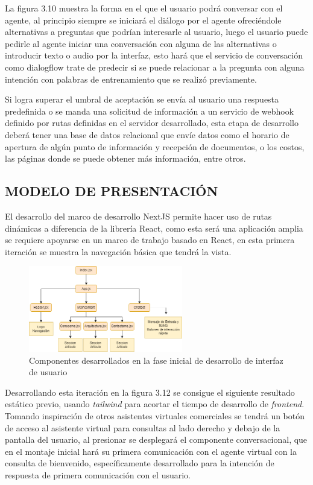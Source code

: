 \documentclass[letter, openright, 12pt]{book}
\begin{document}
La figura 3.10 muestra la forma en el que el usuario podrá conversar con el agente, al principio siempre se iniciará el diálogo por el agente ofreciéndole alternativas a preguntas que podrían interesarle al usuario, luego el usuario puede pedirle al agente iniciar una conversación con alguna de las alternativas o introducir texto o audio por la interfaz, esto hará que el servicio de conversación como dialogflow trate de predecir si se puede relacionar a la pregunta con alguna intención con palabras de entrenamiento que se realizó previamente.
\par
Si logra superar el umbral de aceptación se envía al usuario una respuesta predefinida o se manda una solicitud de información a un servicio de webhook definido por rutas definidas en el servidor desarrollado, esta etapa de desarrollo deberá tener una base de datos relacional que envíe datos como el horario de apertura de algún punto de información y recepción de documentos, o los costos, las páginas donde se puede obtener más información, entre otros.

\subsection{MODELO DE PRESENTACIÓN}

El desarrollo del marco de desarrollo NextJS permite hacer uso de rutas dinámicas a diferencia de la librería React, como esta será una aplicación amplia se requiere apoyarse en un marco de trabajo basado en React, en esta primera iteración se muestra la navegación básica que tendrá la vista. 


\begin{figure}[H]
\centering
\includegraphics[width=0.6\textwidth]{figura3_11}
 \caption{Componentes desarrollados en la fase inicial de desarrollo de interfaz de usuario}
\label{fig:figura3_11}
\end{figure}

Desarrollando esta iteración en la figura 3.12 se consigue el siguiente resultado estático previo, usando {\it tailwind} para acortar el tiempo de desarrollo de {\it frontend}. Tomando inspiración de otros asistentes virtuales comerciales se tendrá un botón de acceso al asistente virtual para consultas al lado derecho y debajo de la pantalla del usuario, al presionar se desplegará el componente conversacional, que en el montaje inicial hará su primera comunicación con el agente virtual con la consulta de bienvenido, específicamente desarrollado para la intención de respuesta de primera comunicación con el usuario. 
\par
\end{document}
